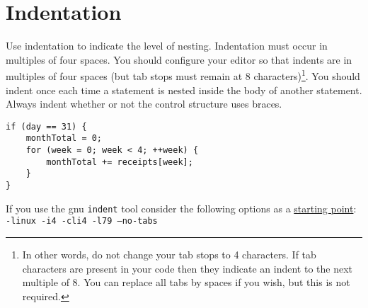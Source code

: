\documentclass{article}
\begin{document}
\linenumbers

\section{Indentation}
Use indentation to indicate the level of nesting.
Indentation must occur in multiples of four spaces.
You should configure your editor so that indents are in multiples of four spaces (but tab stops must remain at 8 characters)\footnote{In other words, do not change your tab stops to 4 characters. If tab characters are 
present in your code then they indicate an indent to the next multiple of 8. You can replace all tabs by spaces
if you wish, but this is not required.}.
You should indent once each time a statement is nested inside the body of another statement.
Always indent whether or not the control structure uses braces.

\nolinenumbers
\begin{lstlisting}
if (day == 31) {
    monthTotal = 0;
    for (week = 0; week < 4; ++week) {
        monthTotal += receipts[week];
    }
}
\end{lstlisting}


\linenumbers

If you use the gnu \texttt{indent} tool consider the following options as a \underline{starting point}:\\
\texttt{-linux -i4 -cli4 -l79 --no-tabs}
\end{document}
